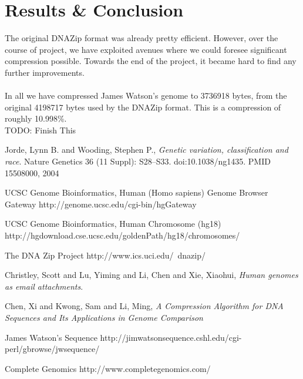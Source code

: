 \documentclass{article}
\begin{document}
\section {Results \& Conclusion}
The original DNAZip format was already pretty efficient. However, over the course of project, we have exploited avenues where we could foresee significant compression possible. Towards the end of the project, it became hard to find any further improvements.\\
\\
In all we have compressed James Watson's genome to 3736918 bytes, from the original 4198717 bytes used by the DNAZip format. This is a compression of roughly 10.998\%. \\

TODO: Finish This
\clearpage

\begin{thebibliography}{}

  Jorde, Lynn B. and Wooding, Stephen P.,
  \emph{Genetic variation, classification and race}.
  Nature Genetics 36 (11 Suppl): S28–S33. doi:10.1038/ng1435. PMID 15508000,
  2004

  UCSC Genome Bioinformatics, Human (Homo sapiens) Genome Browser Gateway
  http://genome.ucsc.edu/cgi-bin/hgGateway

  UCSC Genome Bioinformatics, Human Chromosome (hg18)
  http://hgdownload.cse.ucsc.edu/goldenPath/hg18/chromosomes/

  The DNA Zip Project
  http://www.ics.uci.edu/~dnazip/

  Christley, Scott and Lu, Yiming and Li, Chen and Xie, Xiaohui,
  \emph{Human genomes as email attachments}.

  Chen, Xi and Kwong, Sam and Li, Ming,
  \emph{A Compression Algorithm for DNA Sequences and Its Applications in Genome Comparison}
 
  James Watson's Sequence
  http://jimwatsonsequence.cshl.edu/cgi-perl/gbrowse/jwsequence/

  Complete Genomics
  http://www.completegenomics.com/ 
\end{thebibliography}
\end{document}
